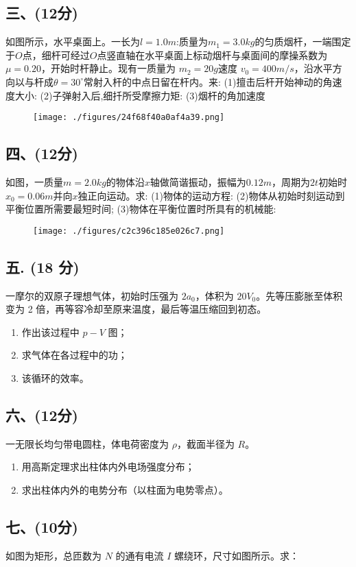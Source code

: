 \subsection{三、(12分)}
如图所示，水平桌面上。一长为$l = 1.0m$:质量为$m_1 = 3.0kg$的匀质烟杆，一端围定于$O$点，细杆可经过$O$点竖直轴在水平桌面上标动烟杆与桌面间的摩操系数为$\mu=0.20$，开始时杆静止。现有一质量为 $m_2 = 20g$速度 $v_0 = 400m/s$，沿水平方向以与杆成$\theta = 30^\circ$常射入杆的中点日留在杆内。来:
(1)擅击后杆开始神动的角速度大小:
(2)子弹射入后,细扦所受摩擦力矩:
(3)烟杆的角加速度
\begin{figure}[ht]
\centering
\texttt{[image: ./figures/24f68f40a0af4a39.png]}
\caption{} \label{fig_NJU10_5}
\end{figure}
\subsection{四、(12分)}
如图，一质量$m=2.0kg$的物体沿$x$轴做简谐振动，振幅为$0.12m$，周期为$2t$初始时$x_0=0.06m$并向$x$独正向运动。求:
(1)物体的运动方程:
(2)物体从初始时刻运动到平衡位置所需要最短时间;
(3)物体在平衡位置时所具有的机械能:
\begin{figure}[ht]
\centering
\texttt{[image: ./figures/c2c396c185e026c7.png]}
\caption{} \label{fig_NJU10_6}
\end{figure}
\subsection{五. (18 分)}
一摩尔的双原子理想气体，初始时压强为 $2a_0$，体积为 $20V_0$。先等压膨胀至体积变为 2 倍，再等容冷却至原来温度，最后等温压缩回到初态。
\begin{enumerate}
    \item 作出该过程中 $p-V$ 图；
    \item 求气体在各过程中的功；
    \item 该循环的效率。
\end{enumerate}
\subsection{六、(12分)}
一无限长均匀带电圆柱，体电荷密度为 $\rho$，截面半径为 $R$。
\begin{enumerate}
    \item 用高斯定理求出柱体内外电场强度分布；
    \item 求出柱体内外的电势分布（以柱面为电势零点）。
\end{enumerate}
\subsection{七、(10分)}
如图为矩形，总匝数为 $N$ 的通有电流 $I$ 螺绕环，尺寸如图所示。求：


